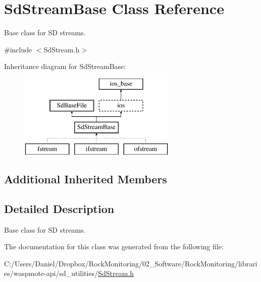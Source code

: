 \hypertarget{class_sd_stream_base}{}\section{Sd\+Stream\+Base Class Reference}
\label{class_sd_stream_base}


Base class for SD streams.  




{\ttfamily \#include $<$Sd\+Stream.\+h$>$}

Inheritance diagram for Sd\+Stream\+Base\+:\begin{figure}[H]
\begin{center}
\leavevmode
\includegraphics[height=4.000000cm]{class_sd_stream_base}
\end{center}
\end{figure}
\subsection*{Additional Inherited Members}


\subsection{Detailed Description}
Base class for SD streams. 

The documentation for this class was generated from the following file\+:\begin{DoxyCompactItemize}
\item 
C\+:/\+Users/\+Daniel/\+Dropbox/\+Rock\+Monitoring/02\+\_\+\+Software/\+Rock\+Monitoring/libraries/waspmote-\/api/sd\+\_\+utilities/\hyperlink{_sd_stream_8h}{Sd\+Stream.\+h}\end{DoxyCompactItemize}
